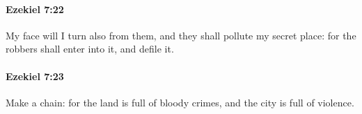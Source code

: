 		\paragraph{Ezekiel 7:22} %
			\label{EZEKIEL-7-22}

			My face will I turn also from them, and they shall pollute my secret place: for the robbers shall enter into it, and defile it.


		\paragraph{Ezekiel 7:23} %
			\label{EZEKIEL-7-23}

			Make a chain: for the land is full of bloody crimes, and the city is full of violence.


